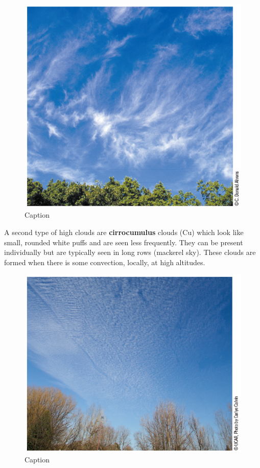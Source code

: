 \documentclass[12pt,oneside]{book}
\begin{document}
\begin{figure}

{\centering \includegraphics[width=0.8\linewidth]{figures/Figure246} 

}

\caption{Caption}\label{fig:CLOUD}
\end{figure}

A second type of high clouds are \textbf{cirrocumulus} clouds (Cu) which
look like small, rounded white puffs and are seen less frequently. They
can be present individually but are typically seen in long rows
(mackerel sky). These clouds are formed when there is some convection,
locally, at high altitudes.

\begin{figure}

{\centering \includegraphics[width=0.8\linewidth]{figures/Figure247} 

}

\caption{Caption}\label{fig:CLOUD2}
\end{figure}
\end{document}
